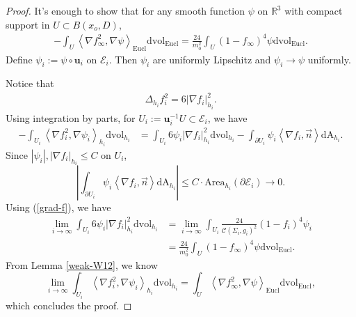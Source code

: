 \documentclass[10pt,a4paper]{amsart}
\def\Area{\mathrm{Area}}
\begin{document}
\begin{proof}
It's enough to show that for any smooth function $\psi $ on $\mathbb{R}^3$ with compact support in $U \subset B(x_o, D) $, 
\begin{align*}
	-\int_{U} \left<\nabla f^2 _\infty, \nabla \psi\right>_{\mathrm{Eucl} } \mathrm{dvol}_{\mathrm{Eucl}} = \frac{24}{m_0^2} \int_{U} (1-f_\infty)^4 \psi \mathrm{dvol}_{\mathrm{Eucl}} .
\end{align*}
Define $\psi _i := \psi \circ \mathbf{u}_i$ on $\mathcal{E}_i$. Then $\psi _i$ are uniformly Lipschitz and $\psi _i \to \psi $ uniformly.

Notice that
\begin{align*}
	\Delta _{h_i}f_i^2 = 6|\nabla f_i|_{h_i}^2.
\end{align*}
Using integration by parts, for $U_i := \mathbf{u}_i^{-1}U \subset \mathcal{E}_i$, we have
\begin{align*}
	-\int_{U_i} \left< \nabla f _i^2, \nabla \psi _i \right>_{h_i} \mathrm{dvol}_{h_i} &= \int_{U_i} 6 \psi _i |\nabla f_i|^2_{h_i} \mathrm{dvol}_{h_i}  - \int_{\partial U_i} \psi _i \left< \nabla f _i, \vec{n} \right> \mathrm{dA}_{h_i}.
\end{align*}
Since $|\psi _i |, |\nabla f _i|_{h_i} \leq C$ on $U_i$,
$$
\left|\int_{\partial U_i} \psi_i \left<\nabla f _i, \vec{n} \right> \mathrm{dA}_{h_i}\right|\leq C\cdot  \Area_{h_i}(\partial \mathcal{E}_i) \to 0.
$$ 
Using (\ref{grad-f}), we have 
\begin{align*}
	\lim_{i\to \infty} \int_{U_i} 6 \psi _i |\nabla f_i|_{h_i}^2 \mathrm{dvol}_{h_i} &= \lim_{i \to \infty} \int_{U_i} \frac{24}{\mathcal{C}(\Sigma _i, g_i)^2} (1-f_i)^{4} \psi _i \\										  &= \frac{24}{m_0^2} \int_{U}(1-f_\infty)^4 \psi \mathrm{dvol}_{\mathrm{Eucl}} .
\end{align*}
From Lemma \ref{weak-W12}, we know 
$$\lim_{i\to \infty} \int_{U_i} \left< \nabla f^2 _i, \nabla \psi _i\right>_{h_i} \mathrm{dvol}_{h_i} = \int_{U} \left< \nabla f^2 _\infty, \nabla \psi\right>_{\mathrm{Eucl}} \mathrm{dvol}_{\mathrm{Eucl}} ,$$
which concludes the proof. 
\end{proof}
\end{document}
